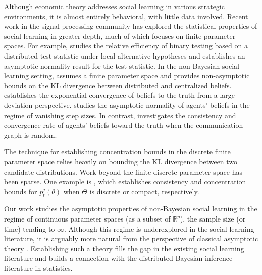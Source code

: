 \documentclass[twoside,11pt]{article}
\numberwithin{equation}{section}
\newcommand{\R}{{\mathbb{R}}}
\begin{document}
Although economic theory addresses social learning in various strategic environments, it is almost entirely behavioral, with little data involved. Recent work in the signal processing community has explored the statistical properties of social learning in greater depth, much of which focuses on finite parameter spaces. For example, \cite{Braca2010} studies the relative efficiency of binary testing based on a distributed test statistic under local alternative hypotheses and establishes an asymptotic normality result for the test statistic. In the non-Bayesian social learning setting, \cite{Shahrampour2015} assumes a finite parameter space and provides non-asymptotic bounds on the KL divergence between distributed and centralized beliefs. \cite{lalitha2014social} establishes the exponential convergence of beliefs to the truth from a large-deviation perspective. \cite{Bordignon2021} studies the asymptotic normality of agents’ beliefs in the regime of vanishing step sizes. In contrast, \cite{Inan2022} investigates the consistency and convergence rate of agents’ beliefs toward the truth when the communication graph is random.

The technique for establishing concentration bounds in the discrete finite parameter space relies heavily on bounding the KL divergence between two candidate distributions. Work beyond the finite discrete parameter space has been sparse. One example is \cite{Uribe2022-1,Uribe2022-2}, which establishes consistency and concentration bounds for $p_t^j(\theta)$ when $\Theta$ is discrete or compact, respectively.

Our work studies the asymptotic properties of non-Bayesian social learning in the regime of continuous parameter spaces (as a subset of $\R^p$), the sample size (or time) tending to $\infty$. Although this regime is underexplored in the social learning literature, it is arguably more natural from the perspective of classical asymptotic theory \citep{VanderVaart2000}. Establishing such a theory fills the gap in the existing social learning literature and builds a connection with the distributed Bayesian inference literature in statistics. 
\end{document}
